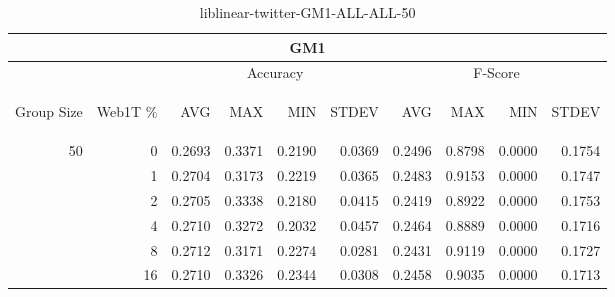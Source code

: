 \begin{center}
\begin{table}[htbp] 
 \begin{center}
\begin{tabular}{ | r | r | r | r | r | r | r | r | r | r |}
\hline
\multicolumn{10}{|c|}{GM1}\\
\hline
 & & \multicolumn{4}{|c|}{Accuracy} & \multicolumn{4}{|c|}{F-Score}\\ \cline{3-10}
\begin{sideways}Group Size\end{sideways} & \begin{sideways}Web1T \%\end{sideways} & \begin{sideways}AVG\end{sideways} & \begin{sideways}MAX\end{sideways} & \begin{sideways}MIN\end{sideways} & \begin{sideways}STDEV\end{sideways} & \begin{sideways}AVG\end{sideways} & \begin{sideways}MAX\end{sideways} & \begin{sideways}MIN\end{sideways} & \begin{sideways}STDEV\end{sideways}\\
\hline
\multirow{5}{*}{50}
 & 0 & 0.2693 & 0.3371 & 0.2190 & 0.0369 & 0.2496 & 0.8798 & 0.0000 & 0.1754\\ \cline{2-10}
 & 1 & 0.2704 & 0.3173 & 0.2219 & 0.0365 & 0.2483 & 0.9153 & 0.0000 & 0.1747\\ \cline{2-10}
 & 2 & 0.2705 & 0.3338 & 0.2180 & 0.0415 & 0.2419 & 0.8922 & 0.0000 & 0.1753\\ \cline{2-10}
 & 4 & 0.2710 & 0.3272 & 0.2032 & 0.0457 & 0.2464 & 0.8889 & 0.0000 & 0.1716\\ \cline{2-10}
 & 8 & 0.2712 & 0.3171 & 0.2274 & 0.0281 & 0.2431 & 0.9119 & 0.0000 & 0.1727\\ \cline{2-10}
 & 16 & 0.2710 & 0.3326 & 0.2344 & 0.0308 & 0.2458 & 0.9035 & 0.0000 & 0.1713\\ \cline{2-10}
\hline
\end{tabular}
\caption{liblinear-twitter-GM1-ALL-ALL-50}
\label{table:liblinear-twitter-GM1-ALL-ALL-50}
\end{center}
 \end{table}
\end{center}

